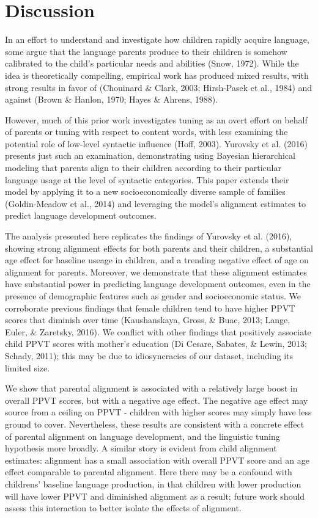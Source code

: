 \documentclass[10pt, letterpaper]{article}
\begin{document}
\hypertarget{discussion}{%
\section{Discussion}\label{discussion}}

In an effort to understand and investigate how children rapidly acquire
language, some argue that the language parents produce to their children
is somehow calibrated to the child's particular needs and abilities
(Snow, 1972). While the idea is theoretically compelling, empirical work
has produced mixed results, with strong results in favor of (Chouinard
\& Clark, 2003; Hirsh-Pasek et al., 1984) and against (Brown \& Hanlon,
1970; Hayes \& Ahrens, 1988).

However, much of this prior work investigates tuning as an overt effort
on behalf of parents or tuning with respect to content words, with less
examining the potential role of low-level syntactic influence (Hoff,
2003). Yurovsky et al. (2016) presents just such an examination,
demonstrating using Bayesian hierarchical modeling that parents align to
their children according to their particular language usage at the level
of syntactic categories. This paper extends their model by applying it
to a new socioeconomically diverse sample of families (Goldin-Meadow et
al., 2014) and leveraging the model's alignment estimates to predict
language development outcomes.

The analysis presented here replicates the findings of Yurovsky et al.
(2016), showing strong alignment effects for both parents and their
children, a substantial age effect for baseline useage in children, and
a trending negative effect of age on alignment for parents. Moreover, we
demonstrate that these alignment estimates have substantial power in
predicting language development outcomes, even in the presence of
demographic features such as gender and socioeconomic status. We
corroborate previous findings that female children tend to have higher
PPVT scores that diminish over time (Kaushanskaya, Gross, \& Buac, 2013;
Lange, Euler, \& Zaretsky, 2016). We conflict with other findings that
positively associate child PPVT scores with mother's education (Di
Cesare, Sabates, \& Lewin, 2013; Schady, 2011); this may be due to
idiosyncracies of our dataset, including its limited size.

We show that parental alignment is associated with a relatively large
boost in overall PPVT scores, but with a negative age effect. The
negative age effect may source from a ceiling on PPVT - children with
higher scores may simply have less ground to cover. Nevertheless, these
results are consistent with a concrete effect of parental alignment on
language development, and the linguistic tuning hypothesis more broadly.
A similar story is evident from child alignment estimates: alignment has
a small association with overall PPVT score and an age effect comparable
to parental alignment. Here there may be a confound with childrens'
baseline language production, in that children with lower production
will have lower PPVT and diminished alignment as a result; future work
should assess this interaction to better isolate the effects of
alignment.
\end{document}

